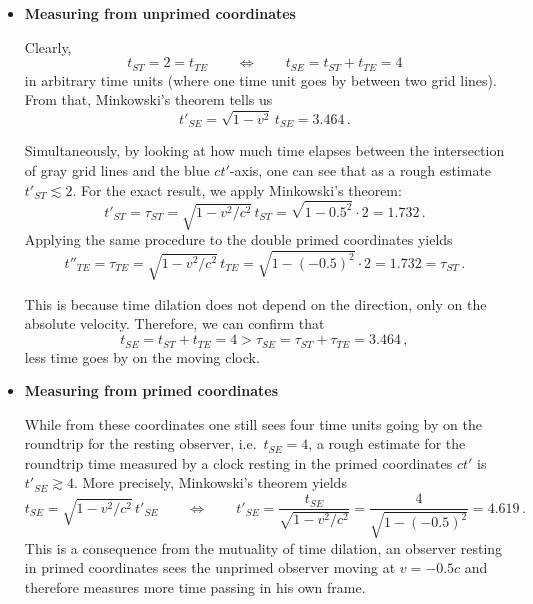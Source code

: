 \begin{ex}
\begin{itemize}
	\item \textbf{Measuring from unprimed coordinates}
	
	Clearly,
	\begin{equation*}
	t_{ST} = 2 = t_{TE}
	\qquad \Leftrightarrow \qquad
	t_{SE} = t_{ST} + t_{TE} = 4
	\end{equation*}
	in arbitrary time units (where one time unit goes by between two grid lines). From that, Minkowski's theorem tells us
	\begin{equation*}
	t'_{SE} = \sqrt{1 - v^2} \, t_{SE} = 3.464 \, .
	\end{equation*}

	Simultaneously, by looking at how much time elapses between the intersection of gray grid lines and the blue $ct'$-axis, one can see that as a rough estimate $t'_{ST} \lesssim 2$. For the exact result, we apply Minkowski's theorem:
	\begin{equation*}
	t'_{ST} = \tau_{ST} = \sqrt{1 - v^2 / c^2} \, t_{ST} = \sqrt{1 - 0.5^2} \cdot 2 = 1.732 \, .
	\end{equation*}
	Applying the same procedure to the double primed coordinates yields
	\begin{equation*}
	t''_{TE} = \tau_{TE} = \sqrt{1 - v^2 / c^2} \, t_{TE} = \sqrt{1 - (-0.5)^2} \cdot 2 = 1.732 = \tau_{ST} \, .
	\end{equation*}
	
	This is because time dilation does not depend on the direction, only on the absolute velocity. Therefore, we can confirm that
	\begin{equation*}
	t_{SE} = t_{ST} + t_{TE} = 4 > \tau_{SE} = \tau_{ST} + \tau_{TE} = 3.464 \, ,
	\end{equation*}
	less time goes by on the moving clock.
	


	\item \textbf{Measuring from primed coordinates}

	While from these coordinates one still sees four time units going by on the roundtrip for the resting observer, i.e.~$t_{SE} = 4$, a rough estimate for the roundtrip time measured by a clock resting in the primed coordinates $ct'$ is $t'_{SE} \gtrsim 4$. More precisely, Minkowski's theorem yields
	\begin{equation*}
	t_{SE} = \sqrt{1 - v^2 / c^2} \, t'_{SE}
	\qquad \Leftrightarrow \qquad
	t'_{SE} = \frac{t_{SE}}{\sqrt{1 - v^2 / c^2}} = \frac{4}{\sqrt{1 - (-0.5)^2}} = 4.619 \, .
	\end{equation*}
	This is a consequence from the mutuality of time dilation, an observer resting in primed coordinates sees the unprimed observer moving at $v = -0.5 c$ and therefore measures more time passing in his own frame.



\end{itemize}
\end{ex}
